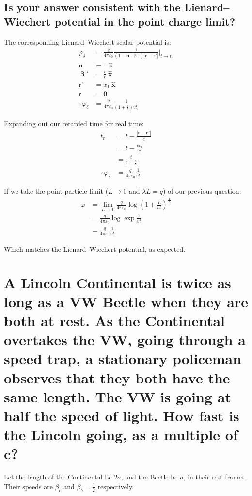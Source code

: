 \documentclass[a4paper]{scrartcl}
\begin{document}
\subsection{Is your answer consistent with the Lienard--Wiechert potential in the point charge limit?}
The corresponding Lienard--Wiechert scalar potential is:
\begin{align*}
    \varphi_\delta &= \frac{q}{4 \pi \varepsilon_0} \frac{1}{(1 - \mathbf{n} \cdot \boldsymbol{\upbeta'})|\mathbf{r} - \mathbf{r'}|} \bigg|_{t \to t_r} \\
    \mathbf{n} &= -\hat{\mathbf{x}} \\
    \boldsymbol{\upbeta'} &= \frac{v}{c} \:\hat{\mathbf{x}} \\
    \mathbf{r'} &= x_1 \:\hat{\mathbf{x}} \\
    \mathbf{r} &= \mathbf{0} \\
    \therefore \varphi_\delta &= \frac{q}{4 \pi \varepsilon_0} \frac{1}{\left(1 + \frac{v}{c}\right) v t_r}
\end{align*}

Expanding out our retarded time for real time:
\begin{align*}
    t_r &= t - \frac{|\mathbf{r} - \mathbf{r'}|}{c} \\
    &= t - \frac{v t_r}{c} \\
    &= \frac{t}{1 + \frac{v}{c}} \\
    \therefore \varphi_\delta &= \frac{q}{4 \pi \varepsilon_0} \frac{1}{v t}
\end{align*}

If we take the point particle limit (\(L \to 0\) and \(\lambda L = q\)) of our previous question:
\begin{align*}
    \varphi &= \lim_{L \to 0} \frac{q}{4 \pi \varepsilon_0} \log\left(1 + \frac{L}{v t}\right)^{\frac{1}{L}} \\
    &= \frac{q}{4 \pi \varepsilon_0} \log \exp \frac{1}{v t} \\
    &= \frac{q}{4 \pi \varepsilon_0} \frac{1}{v t}
\end{align*}

Which matches the Lienard--Wiechert potential, as expected.

\section{A Lincoln Continental is twice as long as a VW Beetle when they are both at rest. As the Continental overtakes the VW, going through a speed trap, a stationary policeman observes that they both have the same length. The VW is going at half the speed of light. How fast is the Lincoln going, as a multiple of c?}
Let the length of the Continental be \(2 a\), and the Beetle be \(a\), in their rest frames. Their speeds are \(\beta_c\) and \(\beta_b = \frac{1}{2}\) respectively.
\end{document}
